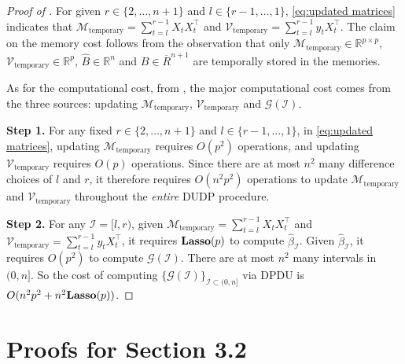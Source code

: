 \documentclass[11pt]{article}
\newcommand{\I}{{\mathcal I }}
\theoremstyle{plain}
\theoremstyle{definition}
\begin{document}
\begin{proof}[Proof of ] 
For given  $r\in\{2, \ldots, n+1 \}$ and $l \in\{r-1,\ldots,1\}$,  \eqref{eq:updated matrices} indicates that $\mathcal M_{\text{temporary}} =\sum_{t = l}^{r-1} X_tX_t^\top$ and $\mathcal V_{\text{temporary}} =\sum_{t = l}^{r-1} y_tX_t ^\top$.  The claim on the memory cost follows from the observation that only $  \mathcal M_{\text{temporary}}  \in \mathbb R^{p\times p }  $,   $\mathcal V_{\text{temporary}} \in \mathbb R^{p  } $, $ \widehat B \in \mathbb R^n$  and $B \in \overline {R}^{n+1}$ are temporally stored in the memories.

As for the computational cost, from ,  the major computational cost comes from the three sources: updating  $\mathcal{M}_{\text{temporary}} $, $\mathcal V _{\text{temporary}}$ and  $\mathcal G(\I) $. 

\noindent \textbf{Step 1.} For any fixed $r\in\{2, \ldots, n+1 \}$ and $l \in\{r-1, \ldots,1\}$,  in \eqref{eq:updated matrices}, updating $\mathcal{M}_{\text{temporary}}$   requires $O(p^2)$ operations, and
updating $\mathcal{V}_{\text{temporary}}$   requires $O(p )$ operations. Since there are at most $n^2$ many difference choices of $l$ and $r$,   it therefore requires   $O(n^2p^2)$ operations 
to update $\mathcal{M}_{\text{temporary}}$ and  $\mathcal{V}_{\text{temporary}}$ throughout the {\it entire} DUDP procedure.

\noindent \textbf{Step 2.} For any $\I =[l, r)$, given $\mathcal M_{\text{temporary}} =\sum_{t = l}^{r-1} X_tX_t^\top$ and $\mathcal V_{\text{temporary}} =\sum_{t = l}^{r-1} y_tX_t ^\top$, it requires ${\bf Lasso}(p)$ to compute $ \widehat \beta _\I $. Given $ \widehat \beta _\I $, it requires $O(p^2)$ to compute $ \mathcal G(\I)$. There are at most $n^2$ many intervals in $(0, n]$. 
So the cost of computing $ \{ \mathcal G(\I)\} _{\I \subset  (0, n] }$ via  DPDU is $O(n^2  p^2 +  n^2 {\bf Lasso}(p))$.
\end{proof}


\section{Proofs for Section 3.2} \label{sec-app-main}
\end{document}
